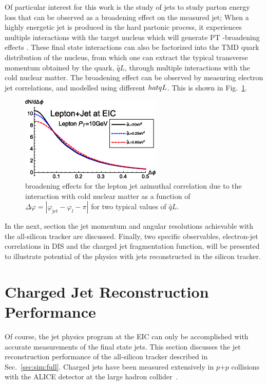 Of particular interest for this work is the study of jets to study parton energy loss that can be observed as a \pt broadening effect on the measured jet; When a highly energetic jet is produced in the hard partonic process, it experiences multiple interactions with the target nucleus which will generate PT -broadening effects \cite{Baier1997}. These final state interactions can also be factorized into the TMD quark distribution of the nucleus, from which one can extract the typical transverse momentum obtained by the quark, $\hat{q}L$, through multiple interactions with the cold nuclear matter\cite{Liang2008a}.  The \pt broadening effect can be observed by measuring electron jet correlations, and modelled using different $\\hat{q}L$. This is shown in Fig.~\ref{fig:ql_corr}.

\begin{figure}[htpb]
  \centering
  \includegraphics[width=0.6\textwidth]{EIC_Jets/qL_corr.png}
  \caption{\pt broadening effects  for the lepton jet azimuthal correlation due to the interaction with cold nuclear matter as a function of $\Delta\varphi = |\varphi_\mathrm{jet} - \varphi_{l} - \pi|$ for two typical values of $\hat{q}L$\cite{Liu2019}.}
  \label{fig:ql_corr}
\end{figure}

In the next, section the jet momentum and angular resolutions achievable with the all-silicon tracker are discussed.
Finally, two specific observables, electron-jet correlations in DIS and the charged jet fragmentation function, will be presented to illustrate potential of the physics with jets reconstructed in the silicon tracker. 


\section{Charged Jet Reconstruction Performance}

Of course, the jet physics program at the EIC can only be accomplished with accurate measurements of the final state jets. This section discusses the jet reconstruction performance of the all-silicon tracker described in Sec.~\ref{sec:sim:full}. Charged jets have been measured extensively in $p$+$p$ collisions with the ALICE detector at the large hadron collider~\cite{PhysRevD.91.112012}.

